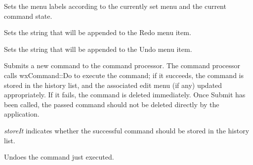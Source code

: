 

Sets the menu labels according to the currently set menu and the current
command state.

\label{wxcommandprocessorsetredoaccelerator}


Sets the string that will be appended to the Redo menu item.

\label{wxcommandprocessorsetundoaccelerator}


Sets the string that will be appended to the Undo menu item.



Submits a new command to the command processor. The command processor
calls wxCommand::Do to execute the command; if it succeeds, the command
is stored in the history list, and the associated edit menu (if any) updated
appropriately. If it fails, the command is deleted
immediately. Once Submit has been called, the passed command should not
be deleted directly by the application.

{\it storeIt} indicates whether the successful command should be stored
in the history list.



Undoes the command just executed.


